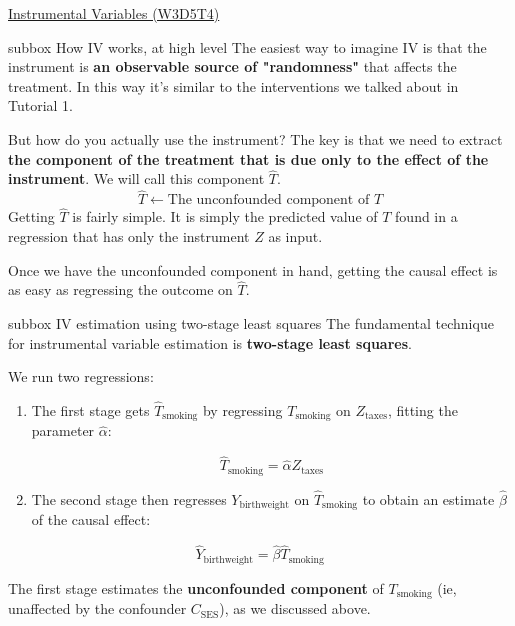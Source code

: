 \begin{textbox}{\href{https://compneuro.neuromatch.io/tutorials/W3D5_NetworkCausality/student/W3D5_Tutorial4.html}{Instrumental Variables (W3D5T4)}   }
\begin{subbox}{subbox}{ How IV works, at high level
}
\scriptsize
The easiest way to imagine IV is that the instrument is \textbf{an observable source of "randomness"} that affects the treatment. In this way it's similar to the interventions we talked about in Tutorial 1.

But how do you actually use the instrument? The key is that we need to extract \textbf{the component of the treatment that is due only to the effect of the instrument}. We will call this component $\hat{T}$.
$$
\hat{T}\leftarrow \text{The unconfounded component of }T
$$
Getting $\hat{T}$ is fairly simple. It is simply the predicted value of $T$ found in a regression that has only the instrument $Z$ as input.

Once we have the unconfounded component in hand, getting the causal effect is as easy as regressing the outcome on $\hat{T}$.

\end{subbox}
\begin{subbox}{subbox}{ IV estimation using two-stage least squares
}
\scriptsize
The fundamental technique for instrumental variable estimation is \textbf{two-stage least squares}. 

We run two regressions:
\begin{enumerate}
    \item 
 The first stage gets  $\hat{T}_{\text{smoking}}$ by regressing $T_{\text{smoking}}$ on $Z_\text{taxes}$, fitting the parameter $\hat{\alpha}$:

\begin{equation}
\hat{T}_{\text{smoking}} = \hat{\alpha} Z_\text{taxes}
\end{equation}

\item The second stage then regresses $Y_{\text{birthweight}}$ on $\hat{T}_{\text{smoking}}$ to obtain an estimate $\hat{\beta}$ of the causal effect:
\end{enumerate}

\begin{equation}
\hat{Y}_{\text{birthweight}} = \hat{\beta} \hat{T}_{\text{smoking}} 
\end{equation}

The first stage estimates the \textbf{unconfounded component} of $T_{\text{smoking}}$ (ie, unaffected by the confounder $C_{\text{SES}}$), as we discussed above. 


\end{subbox}
\end{textbox}
